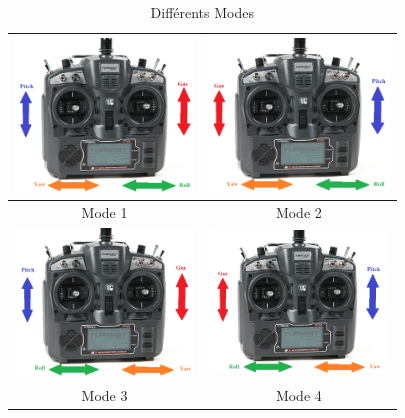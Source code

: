 	\begin{table}[H]
		\begin{center}
			
			\vspace{1cm}	\caption{Différents Modes }
			\begin{tabular}{|c|c|}
				\hline
				
				\centering
				
				\includegraphics[width=4.74cm]{Images/Mode 1(Radiocommande)} & \includegraphics[width=4.8cm]{Images/Mode 2(Radiocommande)}\\
				\hline
				\centering
				
				Mode 1 & Mode 2 \\
				
				\hline
				\centering
				\includegraphics[width=4.69999cm]{Images/Mode 3(Radiocommande)}& \includegraphics[width=4.69999cm]{Images/Mode 4(Radiocommande)}\\
				\hline
				\centering
				
				Mode 3 &  Mode 4 \\
				\hline
			\end{tabular}
		\end{center}
	\end{table}
	
